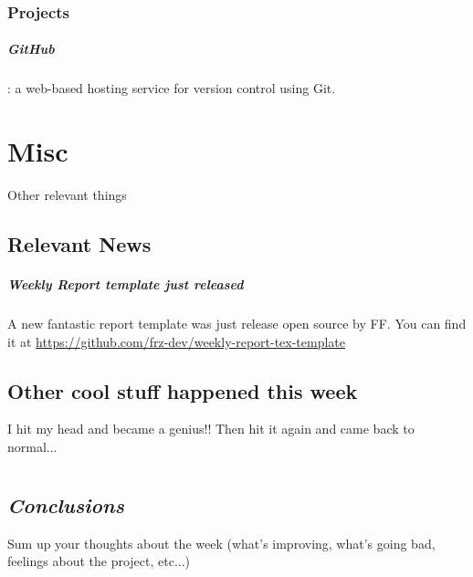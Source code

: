 \subsection{Projects}
\paragraph{GitHub}: a web-based hosting service for version control using Git.

\chapter{Misc}
Other relevant things
%
\section{Relevant News}
\paragraph{Weekly Report template just released} A new fantastic report template was just release open source by FF. You can find it at \href{https://github.com/frz-dev/weekly-report-tex-template}{https://github.com/frz-dev/weekly-report-tex-template}

\section{Other cool stuff happened this week}
I hit my head and became a genius!! Then hit it again and came back to normal...

\chapter{} %
\section*{\centering \textit{Conclusions}}
Sum up your thoughts about the week (what's improving, what's going bad, feelings about the project, etc...)


\vspace*{50px} %
\printbibliography


